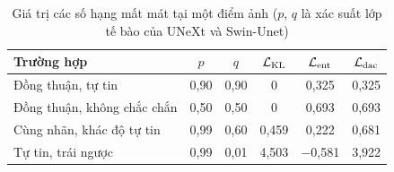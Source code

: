 \begin{table}[!t]
\caption{Giá trị các số hạng mất mát tại một điểm ảnh ($p$, $q$ là xác suất lớp tế bào của UNeXt và Swin-Unet)}
\label{tab:entropy}
\centering
\setlength{\tabcolsep}{3pt}
\begin{tabular}{|p{84pt}|c|c|c|c|c|}
\hline
Trường hợp & $p$ & $q$ & $\mathcal{L}_{\mathrm{KL}}$ & $\mathcal{L}_{\mathrm{ent}}$ & $\mathcal{L}_{\mathrm{dac}}$ \\
\hline
Đồng thuận, tự tin & 0,90 & 0,90 & 0 & 0,325 & 0,325 \\
Đồng thuận, không chắc chắn & 0,50 & 0,50 & 0 & 0,693 & 0,693 \\
Cùng nhãn, khác độ tự tin & 0,99 & 0,60 & 0,459 & 0,222 & 0,681 \\
Tự tin, trái ngược & 0,99 & 0,01 & 4,503 & $-$0,581 & 3,922 \\
\hline
\end{tabular}
\end{table}
